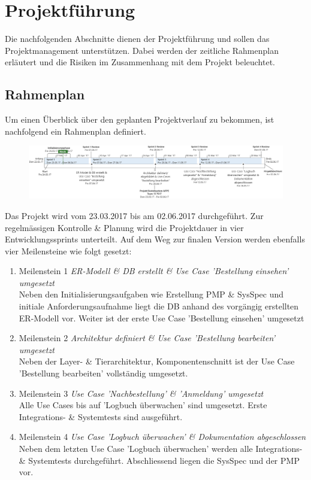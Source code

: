 \section{Projektführung}
Die nachfolgenden Abschnitte dienen der Projektführung und sollen das Projektmanagement unterstützen. Dabei werden der zeitliche Rahmenplan erläutert und die Risiken im Zusammenhang mit dem Projekt beleuchtet.
\subsection{Rahmenplan}
Um einen Überblick über den geplanten Projektverlauf zu bekommen, ist nachfolgend
ein Rahmenplan definiert.
\begin{figure}[H]%
\centering
\includegraphics[width=1.0\textwidth]{Images/GroberTerminplan.png}
\label{fig:title}
\end{figure}
Das Projekt wird vom 23.03.2017 bis am 02.06.2017 durchgeführt. Zur regelmässigen Kontrolle \& Planung wird die Projektdauer in vier Entwicklungssprints unterteilt. Auf dem Weg zur finalen Version werden ebenfalls vier Meilensteine wie folgt gesetzt:
\begin{enumerate}
\item Meilenstein 1 \textit{ER-Modell \& DB erstellt \& Use Case 'Bestellung einsehen' umgesetzt}\\
Neben den Initialisierungsaufgaben wie Erstellung PMP \& SysSpec und initiale Anforderungsaufnahme liegt die DB anhand des vorgängig erstellten ER-Modell vor. Weiter ist der erste Use Case 'Bestellung einsehen' umgesetzt
\item Meilenstein 2 \textit{Architektur definiert \& Use Case 'Bestellung bearbeiten' umgesetzt}\\
Neben der Layer- \& Tierarchitektur, Komponentenschnitt ist der Use Case 'Bestellung bearbeiten' vollständig umgesetzt. 
\item Meilenstein 3 \textit{Use Case 'Nachbestellung' \& 'Anmeldung' umgesetzt} \\
Alle Use Cases bis auf 'Logbuch überwachen' sind umgesetzt. Erste Integrations- \& Systemtests sind ausgeführt.
\item Meilenstein 4 \textit{Use Case 'Logbuch überwachen' \& Dokumentation abgeschlossen}\\
Neben dem letzten Use Case 'Logbuch überwachen' werden alle Integrations- \& Systemtests durchgeführt. Abschliessend liegen die SysSpec und der PMP vor.
\end{enumerate}

